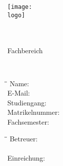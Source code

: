 \pagestyle{empty}

\begin{minipage}{2cm}
	\vspace{-1.7cm}
	\texttt{[image: \\logo]}
\end{minipage}
\begin{minipage}{13.25cm}
	\vspace{-1.5cm}
		\begin{flushright}
			\large{
				\textbf{\institution}\\
				\zusatz\\
				Fachbereich \fachbereich
			}
	\end{flushright}
\end{minipage}

\vspace{4\baselineskip}

\begin{center}
	\Huge{\textbf{\art}}
\end{center}

\vspace{1\baselineskip}

\begin{center}
	\LARGE{\titel}\\
	\Large{\untertitel}
\end{center}

\vspace{4\baselineskip}

\begin{tabbing}
	\hspace*{3.5cm}\=\hspace{5cm}\=\kill
		Name: \>\autor\\
		E-Mail: \>\email\\
		Studiengang: \>\studiengang\\
		Matrikelnummer: \>\matrikelnummer\\
		Fachsemester: \>\fachsemester
\end{tabbing}

\vspace{3\baselineskip}

\begin{tabbing}
	\hspace*{3.5cm}\=\hspace{5cm}\=\kill
		Betreuer: \>\betreuer\\
		\\
		Einreichung: \>\einreichungsdatum
\end{tabbing}